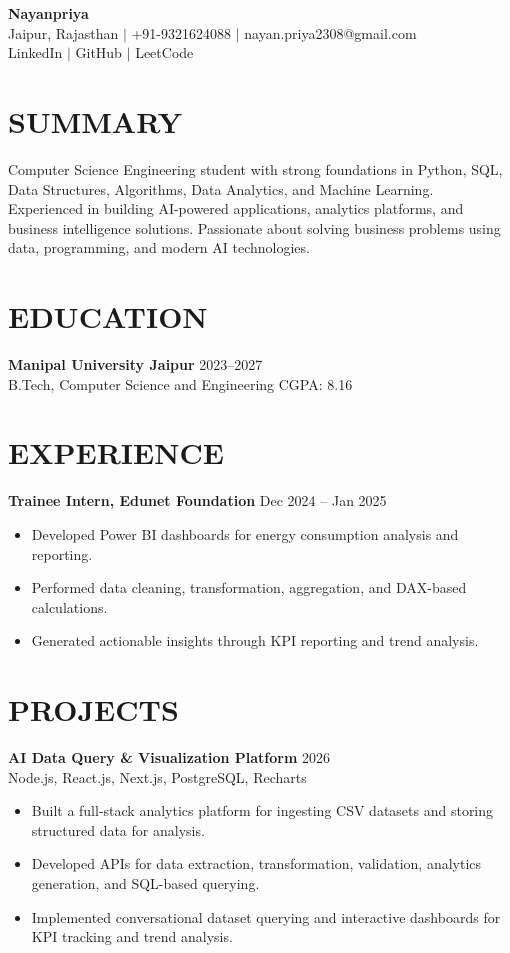 \documentclass[10pt,letterpaper]{article}
\begin{document}
\begin{center}
{\Large \textbf{Nayanpriya}}\\
Jaipur, Rajasthan $\vert$ +91-9321624088 $\vert$ nayan.priya2308@gmail.com\\
LinkedIn $\vert$ GitHub $\vert$ LeetCode
\end{center}

\section*{SUMMARY}
Computer Science Engineering student with strong foundations in Python, SQL, Data Structures, Algorithms, Data Analytics, and Machine Learning. Experienced in building AI-powered applications, analytics platforms, and business intelligence solutions. Passionate about solving business problems using data, programming, and modern AI technologies.

\section*{EDUCATION}
\textbf{Manipal University Jaipur} \hfill 2023--2027\\
B.Tech, Computer Science and Engineering \hfill CGPA: 8.16

\section*{EXPERIENCE}
\textbf{Trainee Intern, Edunet Foundation} \hfill Dec 2024 -- Jan 2025
\begin{itemize}
\item Developed Power BI dashboards for energy consumption analysis and reporting.
\item Performed data cleaning, transformation, aggregation, and DAX-based calculations.
\item Generated actionable insights through KPI reporting and trend analysis.
\end{itemize}

\section*{PROJECTS}

\textbf{AI Data Query \& Visualization Platform} \hfill 2026\\
{\footnotesize Node.js, React.js, Next.js, PostgreSQL, Recharts}
\begin{itemize}
\item Built a full-stack analytics platform for ingesting CSV datasets and storing structured data for analysis.
\item Developed APIs for data extraction, transformation, validation, analytics generation, and SQL-based querying.
\item Implemented conversational dataset querying and interactive dashboards for KPI tracking and trend analysis.
\end{itemize}
\end{document}
